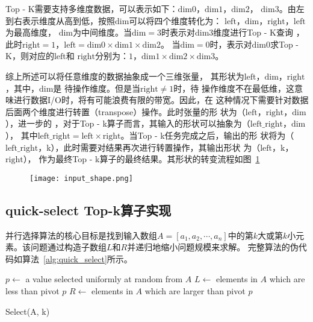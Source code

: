 Top - K需要支持多维度数据，可以表示如下：\(\text{dim0}\)，\(\text{dim1}\)，\(\text{dim2}\)，
\(\text{dim3}\)。由左到右表示维度从高到低，按照\(\text{dim}\)可以将四个维度转化为：
\(\text{left}\)，\(\text{dim}\)，\(\text{right}\)，\(\text{left}\)为最高维度，
\(\text{dim}\)为中间维度。当\(\text{dim} = 3\)时表示对\(\text{dim3}\)维度进行Top - K查询
，此时\(\text{right} = 1\)，\(\text{left} = \text{dim0}×\text{dim1}×\text{dim2}\)。
当\(\text{dim} = 0\)时，表示对\(\text{dim0}\)求Top - K，则对应的\(\text{left}\)和
\(\text{right}\)分别为：\(1\)，\(\text{dim1}×\text{dim2}×\text{dim3}\)。

综上所述可以将任意维度的数据抽象成一个三维张量，
其形状为\(\text{left}\)，\(\text{dim}\)，\(\text{right}\)，其中，\(\text{dim}\)是
待操作维度。但是当\(\text{right}≠1\)时，待
操作维度不在最低维，这意味进行数据I/O时，将有可能浪费有限的带宽。因此，在
这种情况下需要针对数据后面两个维度进行转置（transpose）操作。此时张量的形
状为（\(\text{left}\)，\(\text{right}\)，\(\text{dim}\)），进一步的
，对于Top - k算子而言，其输入的形状可以抽象为（\(\text{left\_right}\)，\(\text{dim}\)），
其中\(\text{left\_right}=\text{left}×\text{right}\)。当Top - k任务完成之后，输出的形
状将为（\(\text{left\_right}\)，\(\text{k}\)），此时需要对结果再次进行转置操作，其输出形状
为（\(\text{left}\)，\(\text{k}\)，\(\text{right}\)），
作为最终Top - k算子的最终结果。其形状的转变流程如图~\ref{fig:input_shape}

\begin{figure}[ht]
    \centering
    \texttt{[image: input\_shape.png]}
    \caption{}
    \label{fig:input_shape}
\end{figure}



    \subsection{quick-select Top-k算子实现}
    并行选择算法的核心目标是找到输入数组\(A = [a_{1}, a_{2},\cdots, a_{n}]\)中的第\(k\)大或第\(k\)小元素。该问题通过构造子数组\(L\)和\(R\)并递归地缩小问题规模来求解。
    完整算法的伪代码如算法~\ref{alg:quick_select}所示。
    
    
    \begin{algorithm}
        \SetAlgoLined
        $p \leftarrow$ a value selected uniformly at random from $A$ 
        $L \leftarrow$ elements in $A$ which are less than pivot $p$ 
        $R \leftarrow$ elements in $A$ which are larger than pivot $p$\\
        \caption{Select(A, k)}
        \label{alg:quick_select}
    \end{algorithm}

